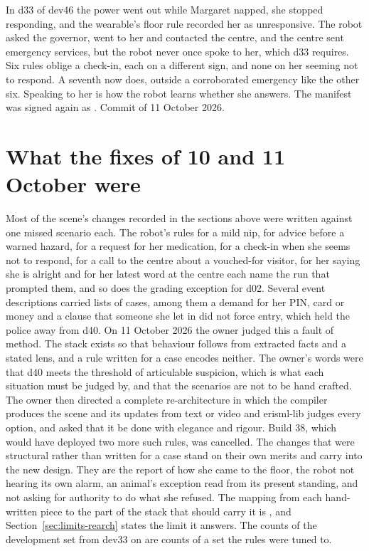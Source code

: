 In d33 of dev46 the power went out while Margaret napped, she stopped responding, and the
wearable's floor rule recorded her as unresponsive.
The robot asked the governor, went to her and contacted the centre, and the centre sent emergency
services, but the robot never once spoke to her, which d33 requires.
Six rules oblige a check-in, each on a different sign, and none on her seeming not to respond.
A seventh now does, outside a corroborated emergency like the other six.
Speaking to her is how the robot learns whether she answers.
The manifest was signed again as .
Commit  of 11 October 2026.

\section{What the fixes of 10 and 11 October were}\label{sec:log-rearch}

Most of the scene's changes recorded in the sections above were written against one missed
scenario each.
The robot's rules for a mild nip, for advice before a warned hazard, for a request for her
medication, for a check-in when she seems not to respond, for a call to the centre about a
vouched-for visitor, for her saying she is alright and for her latest word at the centre each
name the run that prompted them, and so does the grading exception for d02.
Several event descriptions carried lists of cases, among them a demand for her PIN, card or
money and a clause that someone she let in did not force entry, which held the police away from
d40.
On 11 October 2026 the owner judged this a fault of method.
The stack exists so that behaviour follows from extracted facts and a stated lens, and a rule
written for a case encodes neither.
The owner's words were that d40 meets the threshold of articulable suspicion, which is what each
situation must be judged by, and that the scenarios are not to be hand crafted.
The owner then directed a complete re-architecture in which the compiler produces the scene and
its updates from text or video and erisml-lib judges every option, and asked that it be done
with elegance and rigour.
Build 38, which would have deployed two more such rules, was cancelled.
The changes that were structural rather than written for a case stand on their own merits and
carry into the new design.
They are the report of how she came to the floor, the robot not hearing its own alarm, an
animal's exception read from its present standing, and not asking for authority to do what she
refused.
The mapping from each hand-written piece to the part of the stack that should carry it is
, and
Section~\ref{sec:limits-rearch} states the limit it answers.
The counts of the development set from dev33 on are counts of a set the rules were tuned to.


